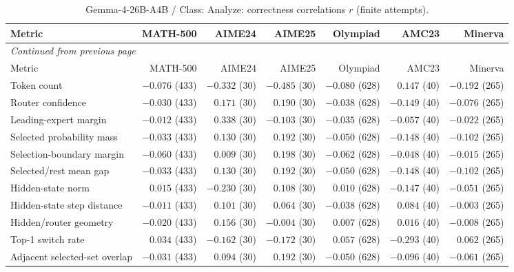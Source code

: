 \begingroup\scriptsize\setlength{\tabcolsep}{4pt}
\begin{longtable}{@{}lrrrrrr@{}}
\caption{Gemma-4-26B-A4B / Class: Analyze: correctness correlations $r$ (finite attempts).}\label{tab:multi-gemma-class-Analyze}\\
\toprule
Metric & MATH-500 & AIME24 & AIME25 & Olympiad & AMC23 & Minerva \\
\midrule\endfirsthead
\multicolumn{7}{l}{\textit{Continued from previous page}}\\
\toprule
Metric & MATH-500 & AIME24 & AIME25 & Olympiad & AMC23 & Minerva \\
\midrule\endhead
\bottomrule\endfoot
Token count & $-0.076$ (433) & $-0.332$ (30) & $-0.485$ (30) & $-0.080$ (628) & $0.147$ (40) & $-0.192$ (265) \\
Router confidence & $-0.030$ (433) & $0.171$ (30) & $0.190$ (30) & $-0.038$ (628) & $-0.149$ (40) & $-0.076$ (265) \\
Leading-expert margin & $-0.012$ (433) & $0.338$ (30) & $-0.103$ (30) & $-0.035$ (628) & $-0.057$ (40) & $-0.022$ (265) \\
Selected probability mass & $-0.033$ (433) & $0.130$ (30) & $0.192$ (30) & $-0.050$ (628) & $-0.148$ (40) & $-0.102$ (265) \\
Selection-boundary margin & $-0.060$ (433) & $0.009$ (30) & $0.198$ (30) & $-0.062$ (628) & $-0.048$ (40) & $-0.015$ (265) \\
Selected/rest mean gap & $-0.033$ (433) & $0.130$ (30) & $0.192$ (30) & $-0.050$ (628) & $-0.148$ (40) & $-0.102$ (265) \\
Hidden-state norm & $0.015$ (433) & $-0.230$ (30) & $0.108$ (30) & $0.010$ (628) & $-0.147$ (40) & $-0.051$ (265) \\
Hidden-state step distance & $-0.011$ (433) & $0.101$ (30) & $0.064$ (30) & $-0.038$ (628) & $0.084$ (40) & $-0.003$ (265) \\
Hidden/router geometry & $-0.020$ (433) & $0.156$ (30) & $-0.004$ (30) & $0.007$ (628) & $0.016$ (40) & $-0.008$ (265) \\
Top-1 switch rate & $0.034$ (433) & $-0.162$ (30) & $-0.172$ (30) & $0.057$ (628) & $-0.293$ (40) & $0.062$ (265) \\
Adjacent selected-set overlap & $-0.031$ (433) & $0.094$ (30) & $0.192$ (30) & $-0.050$ (628) & $-0.096$ (40) & $-0.061$ (265) \\
\end{longtable}\endgroup

